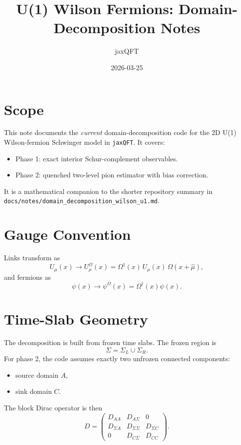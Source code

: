 \documentclass[11pt]{article}
\title{U(1) Wilson Fermions: Domain-Decomposition Notes}
\author{jaxQFT}
\date{2026-03-25}
\begin{document}
\maketitle

\section{Scope}
This note documents the \emph{current} domain-decomposition code for the 2D U(1)
Wilson-fermion Schwinger model in \texttt{jaxQFT}. It covers:
\begin{itemize}
  \item Phase 1: exact interior Schur-complement observables.
  \item Phase 2: quenched two-level pion estimator with bias correction.
\end{itemize}
It is a mathematical companion to the shorter repository summary in
\texttt{docs/notes/domain\_decomposition\_wilson\_u1.md}.

\section{Gauge Convention}
Links transform as
\begin{equation}
U_\mu(x) \to U_\mu^\Omega(x)=\Omega^\dagger(x)\,U_\mu(x)\,\Omega(x+\hat\mu),
\end{equation}
and fermions as
\begin{equation}
\psi(x) \to \psi^\Omega(x)=\Omega^\dagger(x)\psi(x).
\end{equation}

\section{Time-Slab Geometry}
The decomposition is built from frozen time slabs. The frozen region is
\begin{equation}
\Sigma = \Sigma_L \cup \Sigma_R.
\end{equation}
For phase 2, the code assumes exactly two unfrozen connected components:
\begin{itemize}
  \item source domain $A$,
  \item sink domain $C$.
\end{itemize}
The block Dirac operator is then
\begin{equation}
D =
\begin{pmatrix}
D_{AA} & D_{A\Sigma} & 0 \\
D_{\Sigma A} & D_{\Sigma\Sigma} & D_{\Sigma C} \\
0 & D_{C\Sigma} & D_{CC}
\end{pmatrix}.
\end{equation}
\end{document}
